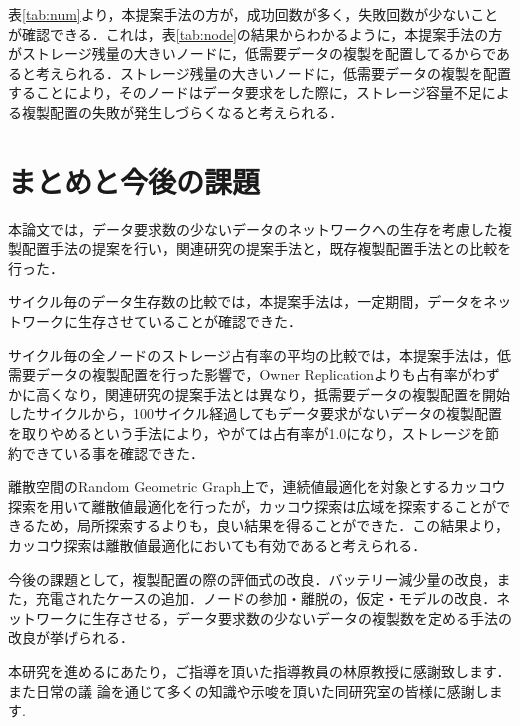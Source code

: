 \documentclass[11pt]{jreport}
\begin{document}
表\ref{tab:num}より，本提案手法の方が，成功回数が多く，失敗回数が少ないことが確認できる．これは，表\ref{tab:node}の結果からわかるように，本提案手法の方がストレージ残量の大きいノードに，低需要データの複製を配置してるからであると考えられる．ストレージ残量の大きいノードに，低需要データの複製を配置することにより，そのノードはデータ要求をした際に，ストレージ容量不足による複製配置の失敗が発生しづらくなると考えられる．

\chapter{まとめと今後の課題}
本論文では，データ要求数の少ないデータのネットワークへの生存を考慮した複製配置手法の提案を行い，関連研究の提案手法と，既存複製配置手法との比較を行った．
\par サイクル毎のデータ生存数の比較では，本提案手法は，一定期間，データをネットワークに生存させていることが確認できた．
\par サイクル毎の全ノードのストレージ占有率の平均の比較では，本提案手法は，低需要データの複製配置を行った影響で，Owner Replicationよりも占有率がわずかに高くなり，関連研究の提案手法とは異なり，抵需要データの複製配置を開始したサイクルから，100サイクル経過してもデータ要求がないデータの複製配置を取りやめるという手法により，やがては占有率が1.0になり，ストレージを節約できている事を確認できた．
\par 離散空間のRandom Geometric Graph上で，連続値最適化を対象とするカッコウ探索を用いて離散値最適化を行ったが，カッコウ探索は広域を探索することができるため，局所探索するよりも，良い結果を得ることができた．この結果より，カッコウ探索は離散値最適化においても有効であると考えられる．
\par 今後の課題として，複製配置の際の評価式の改良．バッテリー減少量の改良，また，充電されたケースの追加．ノードの参加・離脱の，仮定・モデルの改良．ネットワークに生存させる，データ要求数の少ないデータの複製数を定める手法の改良が挙げられる．




 \begin{acknowledgements}
 本研究を進めるにあたり，ご指導を頂いた指導教員の林原教授に感謝致します．また日常の議 論を通じて多くの知識や示唆を頂いた同研究室の皆様に感謝します.
 \end{acknowledgements}

\end{document}
